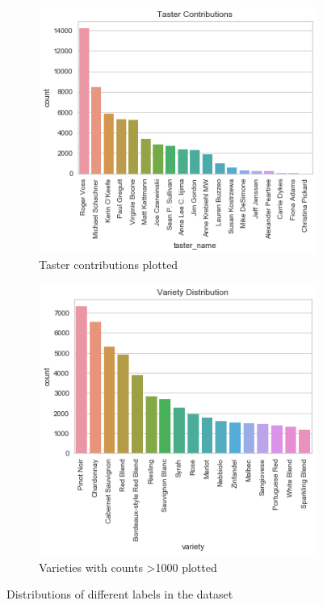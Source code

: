 \documentclass[11pt]{article}
\begin{document}
    \begin{figure} %
    \centering
    \begin{subfigure}[t]{0.4\textwidth}
        \centering
        \includegraphics[width=\textwidth]{taster_contribution}
        \caption{Taster contributions plotted}
    \end{subfigure}
    \begin{subfigure}[t]{0.4\textwidth}
        \centering
        \includegraphics[width=\textwidth]{variety_distribution}
        \caption{Varieties with counts >1000 plotted}
    \end{subfigure}
    \caption{Distributions of different labels in the dataset}
    \label{data_distributions}
    \end{figure}
\end{document}
